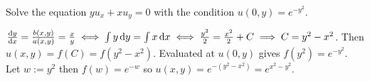 Solve the equation $yu_x + xu_y = 0$ with the condition $u(0,y) = e^{-y^2}$.

\soln* $\dv{y}{x} = \frac{b(x,y)}{a(x,y)} = \frac{x}{y} \iff \int y \dd{y} = \int x \dd{x} \iff \frac{y^2}{2} = \frac{x^2}{2}+C \implies C = y^2 - x^2$. Then $u(x,y) = f(C) = f(y^2 - x^2)$. Evaluated at $u(0,y)$ gives $f(y^2) = e^{-y^2}$. Let $w := y^2$ then $f(w) = e^{-w}$ so $u(x,y) = e^{-(y^2-x^2)} = e^{x^2-y^2}$.